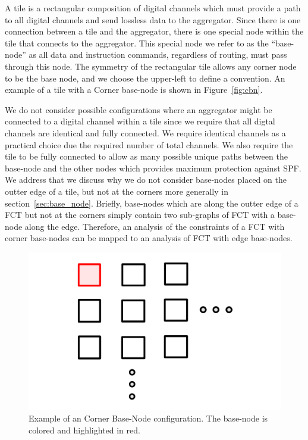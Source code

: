 A tile is a rectangular composition of digital channels which must provide a path to all digital channels and send lossless data to the aggregator.
Since there is one connection between a tile and the aggregator, there is one special node within the tile that connects to the aggregator.
This special node we refer to as the ``base-node'' as all data and instruction commands, regardless of routing, must pass through this node.
The symmetry of the rectangular tile allows any corner node to be the base node, and we choose the upper-left to define a convention.
An example of a tile with a Corner base-node is shown in Figure~\ref{fig:cbn}.

We do not consider possible configurations where an aggregator might be connected to a digital channel within a tile since we require that all digtal channels are identical and fully connected.
We require identical channels as a practical choice due the required number of total channels.
We also require the tile to be fully connected to allow as many possible unique paths between the base-node and the other nodes which provides maximum protection against SPF.
We address that we discuss why we do not consider base-nodes placed on the outter edge of a tile, but not at the corners more generally in section~\ref{sec:base_node}.
Briefly, base-nodes which are along the outter edge of a FCT but not at the corners simply contain two sub-graphs of FCT with a base-node along the edge.
Therefore, an analysis of the constraints of a FCT with corner base-nodes can be mapped to an analysis of FCT with edge base-nodes.

\begin{figure}[]
\centering
\includegraphics[width=\textwidth]{images/CBN.pdf}
\caption{Example of an Corner Base-Node configuration. The base-node is colored and highlighted in red.}
\end{figure}~\label{fig:cbn}

